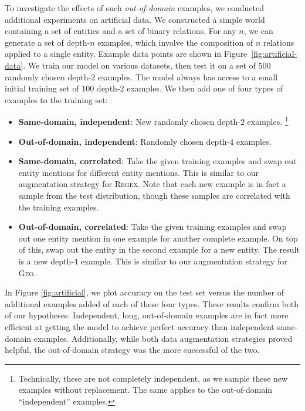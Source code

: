 \documentclass[11pt,letterpaper]{article}
\newcommand{\regex}{\textsc{Regex}\xspace}
\newcommand{\geo}{\textsc{Geo}\xspace}
\begin{document}
To investigate the effects of such \emph{out-of-domain} examples,
we conducted additional experiments on artificial data.
We constructed a simple world containing a set of entities
and a set of binary relations.
For any $n$, we can generate a set of depth-$n$ examples,
which involve the composition of $n$ relations
applied to a single entity.
Example data points are shown in Figure~\ref{fig:artificial-data}.
We train our model on various datasets,
then test it on a set of $500$ randomly chosen depth-$2$ examples.
The model always has access to a small initial training set of $100$ depth-$2$ examples.
We then add one of four types of examples to the training set:
\begin{itemize}
  \item \textbf{Same-domain, independent}: New randomly chosen depth-$2$ examples.
    \footnote{Technically, these are not completely independent, as we
    sample these new examples without replacement.  The same applies to the
  out-of-domain ``independent'' examples.}
  \item \textbf{Out-of-domain, independent}: Randomly chosen depth-$4$ examples.
  \item \textbf{Same-domain, correlated}: Take the given training examples
    and swap out entity mentions for different entity mentions.
    This is similar to our augmentation strategy for \regex.
    Note that each new example is in fact a sample from the test distribution,
    though these samples are correlated with the training examples.
  \item \textbf{Out-of-domain, correlated}: Take the given training examples
    and swap out one entity mention in one example for another complete example.
    On top of this, swap out the entity in the second example for a new entity.
    The result is a new depth-$4$ example.
    This is similar to our augmentation strategy for \geo.
\end{itemize}
In Figure \ref{fig:artificial}, we plot accuracy on the test set 
versus the number of additional examples added of each of these four types.
These results confirm both of our hypotheses.  
Independent, long, out-of-domain examples are in fact more efficient
at getting the model to achieve perfect accuracy than independent same-domain examples.
Additionally, while both data augmentation strategies proved helpful,
the out-of-domain strategy was the more successful of the two.
\end{document}
